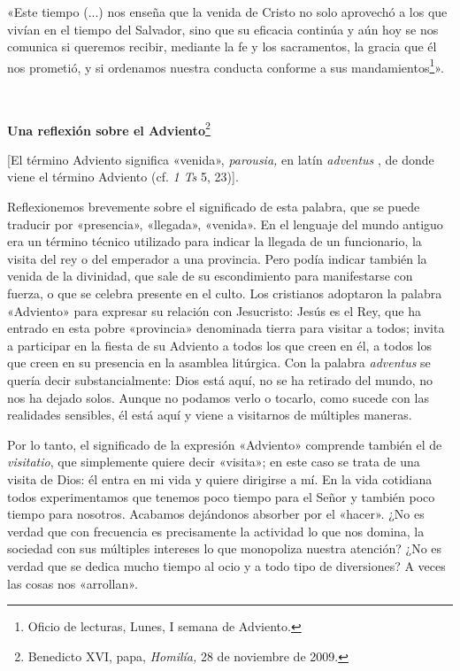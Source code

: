 \documentclass[]{article}
\begin{document}
«Este tiempo (...) nos enseña que la venida de Cristo no solo aprovechó
a los que vivían en el tiempo del Salvador, sino que su eficacia
continúa y aún hoy se nos comunica si queremos recibir, mediante la fe y
los sacramentos, la gracia que él nos prometió, y si ordenamos nuestra
conducta conforme a sus mandamientos\footnote{Oficio de lecturas, Lunes,
	I semana de Adviento.}».

\textbf{\\
}

\textbf{Una reflexión sobre el Adviento}\footnote{Benedicto XVI, papa,
	\emph{Homilía,} 28 de noviembre de 2009.}

{[}El término Adviento significa «venida», \emph{parousia,} en latín
\emph{adventus} , de donde viene el término Adviento (cf. \emph{1 Ts} 5,
23){]}.

Reflexionemos brevemente sobre el significado de esta palabra, que se
puede traducir por «presencia», «llegada», «venida». En el lenguaje del
mundo antiguo era un término técnico utilizado para indicar la llegada
de un funcionario, la visita del rey o del emperador a una provincia.
Pero podía indicar también la venida de la divinidad, que sale de su
escondimiento para manifestarse con fuerza, o que se celebra presente en
el culto. Los cristianos adoptaron la palabra «Adviento» para expresar
su relación con Jesucristo: Jesús es el Rey, que ha entrado en esta
pobre «provincia» denominada tierra para visitar a todos; invita a
participar en la fiesta de su Adviento a todos los que creen en él, a
todos los que creen en su presencia en la asamblea litúrgica. Con la
palabra \emph{adventus} se quería decir substancialmente: Dios está
aquí, no se ha retirado del mundo, no nos ha dejado solos. Aunque no
podamos verlo o tocarlo, como sucede con las realidades sensibles, él
está aquí y viene a visitarnos de múltiples maneras.

Por lo tanto, el significado de la expresión «Adviento» comprende
también el de \emph{visitatio}, que simplemente quiere decir «visita»;
en este caso se trata de una visita de Dios: él entra en mi vida y
quiere dirigirse a mí. En la vida cotidiana todos experimentamos que
tenemos poco tiempo para el Señor y también poco tiempo para nosotros.
Acabamos dejándonos absorber por el «hacer». ¿No es verdad que con
frecuencia es precisamente la actividad lo que nos domina, la sociedad
con sus múltiples intereses lo que monopoliza nuestra atención? ¿No es
verdad que se dedica mucho tiempo al ocio y a todo tipo de diversiones?
A veces las cosas nos «arrollan».
\end{document}
